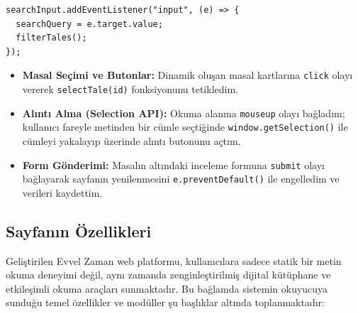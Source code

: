 \documentclass[12pt,a4paper]{article}
\begin{document}
\begin{lstlisting}[caption={Olay Dinleyicileri (Event Listeners)}]
searchInput.addEventListener("input", (e) => {
  searchQuery = e.target.value;
  filterTales();
});
\end{lstlisting}

\begin{itemize}
  \item \textbf{Masal Seçimi ve Butonlar:} Dinamik oluşan masal kartlarına \texttt{click} olayı vererek \texttt{selectTale(id)} fonksiyonunu tetikledim.
  \item \textbf{Alıntı Alma (Selection API):} Okuma alanına \texttt{mouseup} olayı bağladım; kullanıcı fareyle metinden bir cümle seçtiğinde \texttt{window.getSelection()} ile cümleyi yakalayıp üzerinde alıntı butonunu açtım.
  \item \textbf{Form Gönderimi:} Masalın altındaki inceleme formuna \texttt{submit} olayı bağlayarak sayfanın yenilenmesini \texttt{e.preventDefault()} ile engelledim ve verileri kaydettim.
\end{itemize}

\subsection{Sayfanın Özellikleri}
Geliştirilen Evvel Zaman web platformu, kullanıcılara sadece statik bir metin okuma deneyimi değil, aynı zamanda zenginleştirilmiş dijital kütüphane ve etkileşimli okuma araçları sunmaktadır. Bu bağlamda sistemin okuyucuya sunduğu temel özellikler ve modüller şu başlıklar altında toplanmaktadır:
\end{document}
